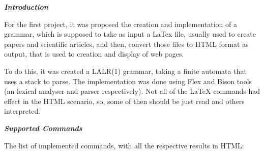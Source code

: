 \documentclass{article}
\begin{document}
\textbf{\textit{Introduction}}

For the first project, it was proposed the creation and implementation of a grammar, which is supposed to take as input a LaTex file, usually used to create papers and scientific articles, and then, convert those files to HTML format as output, that is used to creation and display of web pages.

To do this, it was created a LALR(1) grammar, taking a finite automata that uses a stack to parse. The implementation was done using Flex and Bison tools (an lexical analyser and parser respectively). Not all of the LaTeX commands had effect in the HTML scenario, so, some of then should be just read and others interpreted.

\textit{\textbf{Supported Commands}}

The list of implemented commands, with all the respective results in HTML:
\end{document}

